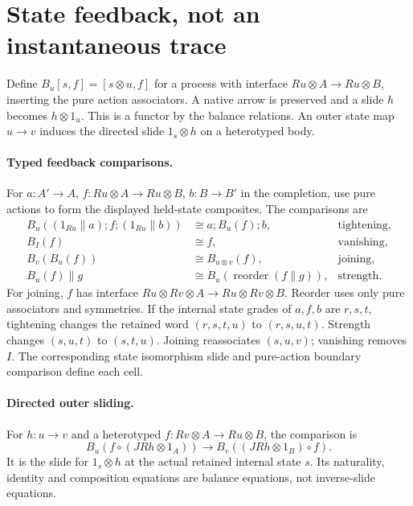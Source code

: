 \documentclass[11pt]{article}
\begin{document}
\section{State feedback, not an instantaneous trace}
Define $B_u[s,f]=[s\otimes u,f]$ for a process with interface $Ru\otimes A\to Ru\otimes B$, inserting the pure action associators. A native arrow is preserved and a slide $h$ becomes $h\otimes1_u$. This is a functor by the balance relations. An outer state map $u\to v$ induces the directed slide $1_s\otimes h$ on a heterotyped body.

\paragraph{Typed feedback comparisons.}
For $a:A'\to A$, $f:Ru\otimes A\to Ru\otimes B$, $b:B\to B'$ in the completion, use pure actions to form the displayed held-state composites. The comparisons are
\begin{align*}
 B_u((1_{Ru}\parallel a);f;(1_{Ru}\parallel b))
   &\cong a;B_u(f);b, &\text{tightening},\\
 B_I(f)&\cong f, &\text{vanishing},\\
 B_v(B_u(f))&\cong B_{u\otimes v}(f), &\text{joining},\\
 B_u(f)\parallel g&\cong B_u(\operatorname{reorder}(f\parallel g)),
   &\text{strength}.
\end{align*}
For joining, $f$ has interface $Ru\otimes Rv\otimes A\to Ru\otimes Rv\otimes B$. Reorder uses only pure associators and symmetries. If the internal state grades of $a,f,b$ are $r,s,t$, tightening changes the retained word $(r,s,t,u)$ to $(r,s,u,t)$. Strength changes $(s,u,t)$ to $(s,t,u)$. Joining reassociates $(s,u,v)$; vanishing removes $I$. The corresponding state isomorphism slide and pure-action boundary comparison define each cell.

\paragraph{Directed outer sliding.}
For $h:u\to v$ and a heterotyped $f:Rv\otimes A\to Ru\otimes B$, the comparison is
\[
 B_u(f\circ(JRh\otimes1_A))\longrightarrow
 B_v((JRh\otimes1_B)\circ f).
\]
It is the slide for $1_s\otimes h$ at the actual retained internal state $s$. Its naturality, identity and composition equations are balance equations, not inverse-slide equations.
\end{document}
